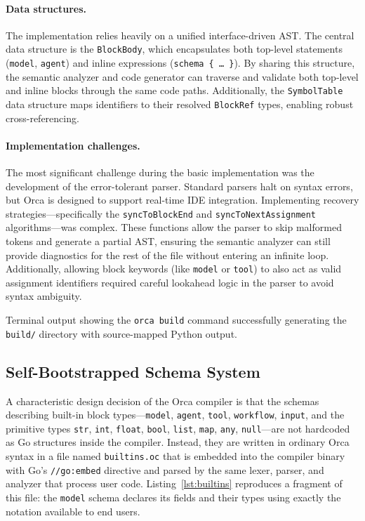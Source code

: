 \documentclass[sigconf,nonacm]{acmart}
\begin{document}
\paragraph{Data structures.} The implementation relies heavily on a unified
interface-driven AST. The central data structure is the \texttt{BlockBody},
which encapsulates both top-level statements (\texttt{model}, \texttt{agent})
and inline expressions (\texttt{schema \{ \ldots\ \}}). By sharing this
structure, the semantic analyzer and code generator can traverse and validate
both top-level and inline blocks through the same code paths. Additionally,
the \texttt{SymbolTable} data structure maps identifiers to their resolved
\texttt{BlockRef} types, enabling robust cross-referencing.

\paragraph{Implementation challenges.} The most significant challenge during
the basic implementation was the development of the error-tolerant parser.
Standard parsers halt on syntax errors, but Orca is designed to support
real-time IDE integration. Implementing recovery
strategies---specifically the \texttt{syncToBlockEnd} and
\texttt{syncToNextAssignment} algorithms---was complex. These functions
allow the parser to skip malformed tokens and generate a partial AST,
ensuring the semantic analyzer can still provide diagnostics for the rest of
the file without entering an infinite loop. Additionally, allowing block
keywords (like \texttt{model} or \texttt{tool}) to also act as valid
assignment identifiers required careful lookahead logic in the parser to
avoid syntax ambiguity.

\begin{imgplaceholder}[title={Screenshot: successful \texttt{orca build}}]
Terminal output showing the \texttt{orca build} command successfully
generating the \texttt{build/} directory with source-mapped Python output.
\end{imgplaceholder}

\subsection{Self-Bootstrapped Schema System}
\label{sec:implementation:bootstrap}

A characteristic design decision of the Orca compiler is that the schemas
describing built-in block types---\texttt{model}, \texttt{agent},
\texttt{tool}, \texttt{workflow}, \texttt{input}, and the primitive types
\texttt{str}, \texttt{int}, \texttt{float}, \texttt{bool}, \texttt{list},
\texttt{map}, \texttt{any}, \texttt{null}---are not hardcoded as Go
structures inside the compiler. Instead, they are written in ordinary Orca
syntax in a file named \texttt{builtins.oc} that is embedded into the
compiler binary with Go's \texttt{//go:embed} directive and parsed by the
same lexer, parser, and analyzer that process user code. Listing~\ref{lst:builtins}
reproduces a fragment of this file: the \texttt{model} schema declares its
fields and their types using exactly the notation available to end users.
\end{document}
